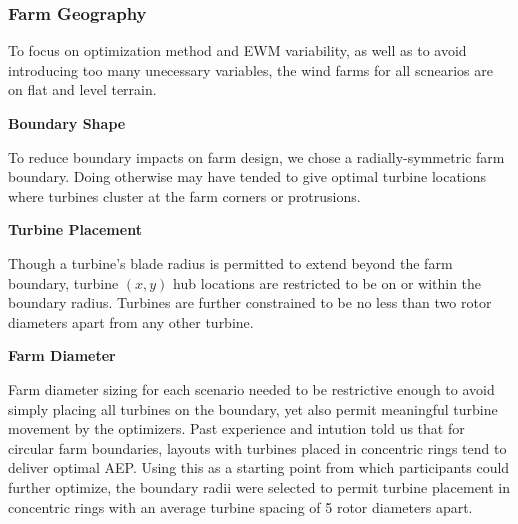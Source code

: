\subsubsection{Farm Geography} \label{sec:farmgeog}
	To focus on optimization method and EWM variability, as well as to avoid introducing too many unecessary variables, the wind farms for all scnearios are on flat and level terrain.

\vspace{3mm}
\noindent\textbf{Boundary Shape}

	\noindent To reduce boundary impacts on farm design, we chose a radially-symmetric farm boundary.
	Doing otherwise may have tended to give optimal turbine locations where turbines cluster at the farm corners or protrusions.

\vspace{3mm}
\noindent\textbf{Turbine Placement}

	\noindent Though a turbine's blade radius is permitted to extend beyond the farm boundary, turbine $(x, y)$ hub locations are restricted to be on or within the boundary radius.
	Turbines are further constrained to be no less than two rotor diameters apart from any other turbine.

\vspace{3mm}
\noindent\textbf{Farm Diameter}

	\noindent Farm diameter sizing for each scenario needed to be restrictive enough to avoid simply placing all turbines on the boundary, yet also permit meaningful turbine movement by the optimizers.
	Past experience and intution told us that for circular farm boundaries, layouts with turbines placed in concentric rings tend to deliver optimal AEP.
	Using this as a starting point from which participants could further optimize, the boundary radii were selected to permit turbine placement in concentric rings with an average turbine spacing of 5 rotor diameters apart.
	


